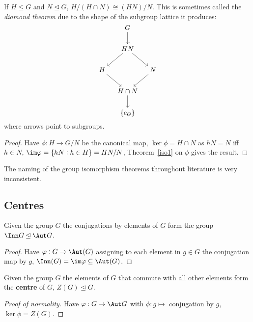 \documentclass[../Year2.tex]{subfiles}
\begin{document}
\begin{theorem}\label{iso2}
    If $H\leq G$ and $N\unlhd G$, $H/(H\cap N)\cong (HN)/N$. This is sometimes called the \textit{diamond theorem} due to the shape of the subgroup lattice it produces: \[
        \begin{tikzcd}[cramped, column sep=small]
            & G \arrow[d]& \\
            & HN \arrow[ld] \arrow [rd]& \\
            H \arrow[rd] & & N \arrow[ld]\\
            & H\cap N \arrow[d]& \\
            & \{e_G\}& 
        \end{tikzcd}
    \] where arrows point to subgroups.
    \begin{proof}
        Have $\phi:H\rightarrow G/N$ be the canonical map, $\ker\phi = H\cap N$ as $hN=N$ iff $h\in N$, $\im \phi = \{hN:h\in H\}=HN/N$, Theorem~\ref{iso1} on $\phi$ gives the result.
    \end{proof}
\end{theorem}

\begin{note}
    The naming of the group isomorphism theorems throughout literature is very inconsistent.
\end{note}

\subsection{Centres}

\begin{definition}
    Given the group $G$ the conjugations by elements of $G$ form the group $\Inn G\unlhd\Aut G$.
    \begin{proof}
        Have $\phi:G\rightarrow \Aut(G)$ assigning to each element in $g\in G$ the conjugation map by $g$, $\Inn(G) = \im \phi \subseteq \Aut(G)$. 
    \end{proof}
\end{definition}

\begin{definition}
    Given the group $G$ the elements of $G$ that commute with all other elements form the \textbf{centre} of $G$, $Z(G)\unlhd G$.
    \begin{proof}[Proof of normality]
        Have $\phi:G\rightarrow\Aut G$ with $\phi:g\mapsto$ conjugation by $g$, $\ker \phi = Z(G)$.
    \end{proof}
\end{definition}
\end{document}
